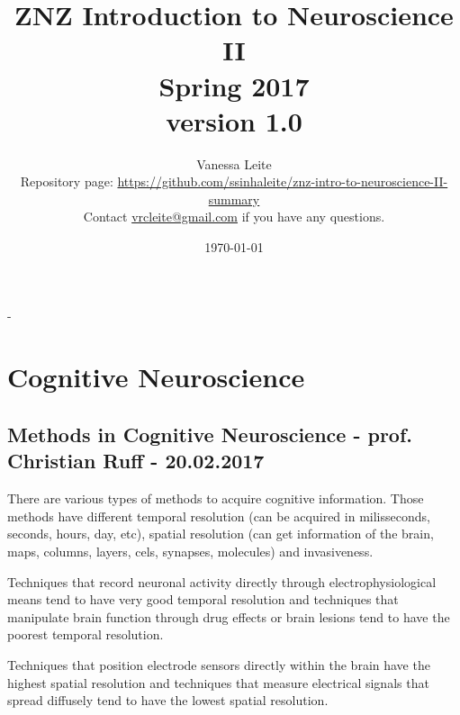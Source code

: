 \documentclass[12pt,article,oneside,a4paper]{memoir}
\title{\textbf{ZNZ Introduction to Neuroscience II} \\
       Spring 2017\\\normalsize version 1.0}
\author{
	Vanessa Leite
	\vspace{2em}
	\\Repository page: \url{https://github.com/ssinhaleite/znz-intro-to-neuroscience-II-summary}\\
	Contact \href{mailto:vrcleite@gmail.com}{vrcleite@gmail.com} if you have any questions.}
\date{\today}
\begin{document}
\frontmatter


\begin{titlingpage}
  \calccentering{\unitlength}
  \begin{adjustwidth*}{\unitlength-24pt}{-\unitlength-24pt}
    \maketitle
  \end{adjustwidth*}
\end{titlingpage}

\mainmatter



\newpage
\clearpage
{}
\setcounter{tocdepth}{3}
\setcounter{secnumdepth}{2}
\tableofcontents

\clearpage
{}

\section{Cognitive Neuroscience}

\subsection{Methods in Cognitive Neuroscience - prof. Christian Ruff - 20.02.2017}

There are various types of methods to acquire cognitive information. Those
methods have different temporal resolution (can be acquired in milisseconds,
seconds, hours, day, etc), spatial resolution (can get information of the
brain, maps, columns, layers, cels, synapses, molecules) and invasiveness.

Techniques that record neuronal activity directly through electrophysiological
means tend to have very good temporal resolution and techniques that manipulate
brain function through drug effects or brain lesions tend to have the poorest
temporal resolution.

Techniques that position electrode sensors directly within the brain have the
highest spatial resolution and techniques that measure electrical signals that
spread diffusely tend to have the lowest spatial resolution.
\end{document}
